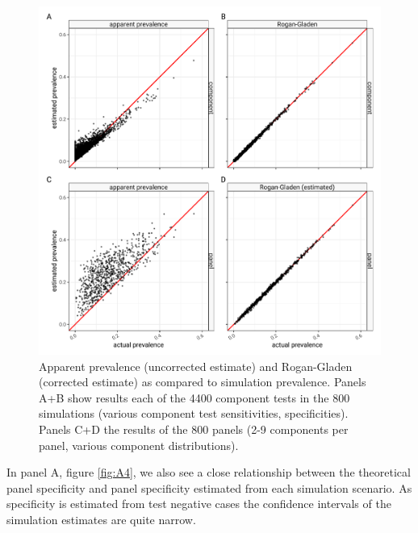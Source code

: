 \documentclass[a4paper, 12pt, twoside]{article}
\begin{document}
\begin{figure}[h!]
\centering
  \includegraphics{fig/qq-prevalence-prediction-v-simulation.png}
  \caption{Apparent prevalence (uncorrected estimate) and Rogan-Gladen (corrected estimate) as compared to simulation prevalence. Panels A+B show results each of the 4400 component tests in the 800 simulations (various component test sensitivities, specificities). Panels C+D the results of the 800 panels (2-9 components per panel, various component distributions).}
\label{fig:A3}
\end{figure}


In panel A, figure \ref{fig:A4}, we also see a close relationship between the theoretical panel specificity and panel specificity estimated from each simulation scenario. As specificity is estimated from test negative cases the confidence intervals of the simulation estimates are quite narrow.
\end{document}
